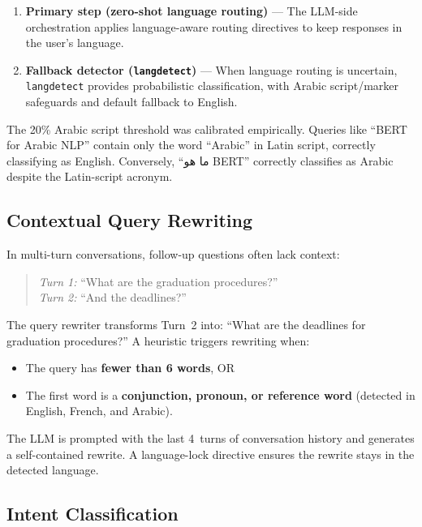 \documentclass[12pt, a4paper]{article}
\begin{document}
\begin{enumerate}[leftmargin=2em]
  \item \textbf{Primary step (zero-shot language routing)} --- The LLM-side
        orchestration applies language-aware routing directives to keep
        responses in the user's language.
  \item \textbf{Fallback detector (\texttt{langdetect})} --- When language
        routing is uncertain, \texttt{langdetect} provides probabilistic
        classification, with Arabic script/marker safeguards and default
        fallback to English.
\end{enumerate}

\begin{notebox}
The 20\% Arabic script threshold was calibrated empirically. Queries like
``BERT for Arabic NLP'' contain only the word ``Arabic'' in Latin script,
correctly classifying as English. Conversely, ``ما هو BERT'' correctly
classifies as Arabic despite the Latin-script acronym.
\end{notebox}

\subsection{Contextual Query Rewriting}

In multi-turn conversations, follow-up questions often lack context:
\begin{quote}
\textit{Turn 1:} ``What are the graduation procedures?'' \\
\textit{Turn 2:} ``And the deadlines?''
\end{quote}

The query rewriter transforms Turn~2 into: ``What are the deadlines for
graduation procedures?'' A heuristic triggers rewriting when:
\begin{itemize}[leftmargin=2em]
  \item The query has \textbf{fewer than 6 words}, OR
  \item The first word is a \textbf{conjunction, pronoun, or reference word}
        (detected in English, French, and Arabic).
\end{itemize}

The LLM is prompted with the last 4~turns of conversation history and
generates a self-contained rewrite. A language-lock directive ensures the
rewrite stays in the detected language.

\subsection{Intent Classification}
\end{document}
